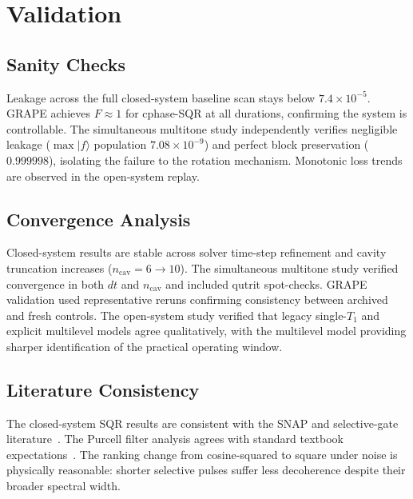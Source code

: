 \documentclass[aps,pra,twocolumn,reprint,amsmath,amssymb]{revtex4-2}
\begin{document}
\section{Validation}

\subsection{Sanity Checks}
Leakage across the full closed-system baseline scan stays below $7.4\times 10^{-5}$. GRAPE achieves $F\approx 1$ for cphase-SQR at all durations, confirming the system is controllable. The simultaneous multitone study independently verifies negligible leakage ($\max|f\rangle$ population $7.08\times 10^{-9}$) and perfect block preservation ($0.999998$), isolating the failure to the rotation mechanism. Monotonic loss trends are observed in the open-system replay.

\subsection{Convergence Analysis}
Closed-system results are stable across solver time-step refinement and cavity truncation increases ($n_\mathrm{cav}=6\to 10$). The simultaneous multitone study verified convergence in both $dt$ and $n_\mathrm{cav}$ and included qutrit spot-checks. GRAPE validation used representative reruns confirming consistency between archived and fresh controls. The open-system study verified that legacy single-$T_1$ and explicit multilevel models agree qualitatively, with the multilevel model providing sharper identification of the practical operating window.

\subsection{Literature Consistency}
The closed-system SQR results are consistent with the SNAP and selective-gate literature~\cite{heeres2015snap,krastanov2015universal,heeres2017logical}. The Purcell filter analysis agrees with standard textbook expectations~\cite{blais2021circuit}. The ranking change from cosine-squared to square under noise is physically reasonable: shorter selective pulses suffer less decoherence despite their broader spectral width.

\end{document}
